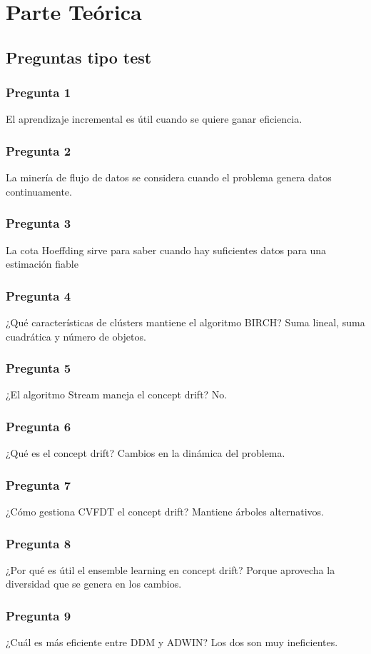 \chapter{Parte Teórica}
\section{Preguntas tipo test}
\subsection{Pregunta 1}
El aprendizaje incremental es útil cuando se quiere ganar eficiencia.
\subsection{Pregunta 2}
La minería de flujo de datos se considera cuando el problema genera datos continuamente.
\subsection{Pregunta 3}
La cota Hoeffding sirve para saber cuando hay suficientes datos para una estimación fiable
\subsection{Pregunta 4}
¿Qué características de clústers mantiene el algoritmo BIRCH?
Suma lineal, suma cuadrática y número de objetos.
\subsection{Pregunta 5}
¿El algoritmo Stream maneja el concept drift?
No.
\subsection{Pregunta 6}
¿Qué es el concept drift?
Cambios en la dinámica del problema.
\subsection{Pregunta 7}
¿Cómo gestiona CVFDT el concept drift?
Mantiene árboles alternativos.
\subsection{Pregunta 8}
¿Por qué es útil el ensemble learning en concept drift?
Porque aprovecha la diversidad que se genera en los cambios.
\subsection{Pregunta 9}
¿Cuál es más eficiente entre DDM y ADWIN?
Los dos son muy ineficientes.
